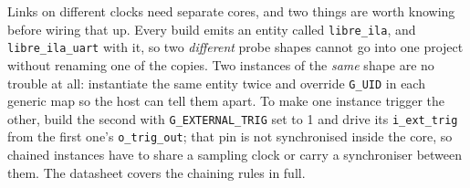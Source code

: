 \documentclass[../manual.tex]{subfiles}
\begin{document}
Links on different clocks need separate cores, and two things are worth knowing before wiring that up. Every build emits an entity called \texttt{libre\_ila}, and \texttt{libre\_ila\_uart} with it, so two \emph{different} probe shapes cannot go into one project without renaming one of the copies. Two instances of the \emph{same} shape are no trouble at all: instantiate the same entity twice and override \texttt{G\_UID} in each generic map so the host can tell them apart. To make one instance trigger the other, build the second with \texttt{G\_EXTERNAL\_TRIG} set to 1 and drive its \texttt{i\_ext\_trig} from the first one's \texttt{o\_trig\_out}; that pin is not synchronised inside the core, so chained instances have to share a sampling clock or carry a synchroniser between them. The datasheet covers the chaining rules in full.
\end{document}
